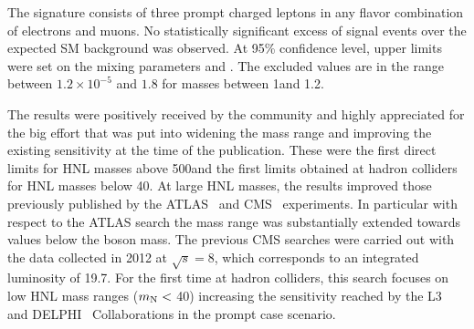 The signature consists of three prompt charged leptons in any flavor combination of electrons
and muons.
No statistically significant excess of signal events over the expected
SM background was observed. At 95\% confidence level, upper limits were set on the mixing
parameters \mixpare and \mixparm. 
The excluded values are in the
range between $1.2\times 10^{-5}$ and $1.8$ for masses 
between 1\GeV and 1.2\TeV. 

The results were positively received by the community and highly appreciated
for the big effort that was put into widening the mass range and
improving the existing sensitivity at the time of the publication.
These were the first direct limits for HNL masses above 500\GeV and the first
limits obtained at hadron colliders for HNL masses below 40\GeV.
At large HNL masses, the results improved those previously published
by the ATLAS~\cite{Aad_2015} and CMS~\cite{Khachatryan_2015,Sirunyan:2018xiv}
experiments. In particular with respect to the ATLAS search the mass
range was substantially extended towards values below the \PW boson
mass. The previous CMS searches were carried out with the data
collected in 2012 at $\sqrt{s} = 8$\TeV, which corresponds to an
integrated luminosity of 19.7\fbinv. 
For the first time at hadron colliders, this search focuses on low HNL mass ranges
($ m_\mathrm{N} < $ 40\GeV) increasing the sensitivity reached by the
L3~\cite{ACHARD200167} and DELPHI~\cite{Abreu:1996pa} Collaborations
in the prompt case scenario.\\

